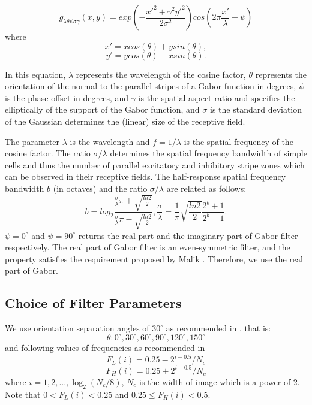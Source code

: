 \documentclass[article,oneside]{memoir}
\begin{document}
\begin{equation}
g_{\lambda\theta\psi\sigma\gamma}(x,y)=exp(-\frac{x'^2+\gamma^2y'^2}{2\sigma^2})cos(2\pi\frac{x'}{\lambda}+\psi)
\end{equation}
where 
$$x' = x cos(\theta) + y sin(\theta), $$
$$ y' = y cos(\theta) - x sin(\theta). $$  

In this equation,  $ \lambda $ represents the wavelength of the cosine factor,  $ \theta $ represents the orientation of the normal to the parallel stripes of a Gabor function in degrees,  $ \psi $ is the phase offset in degrees, and  $ \gamma $ is the spatial aspect ratio and specifies the elliptically of the support of the Gabor function, and $ \sigma $ is the standard deviation of the Gaussian determines the (linear) size of the receptive field. 

The parameter $ \lambda $ is the wavelength and $ f = 1 / \lambda$ is the spatial frequency of the cosine factor. 
The ratio $ \sigma / \lambda $ determines the spatial frequency bandwidth of simple cells and thus the number of parallel excitatory and inhibitory stripe zones which can be observed in their receptive fields. The half-response spatial frequency bandwidth $ b$  (in octaves) and the ratio $ \sigma / \lambda $ are related as follows: 
\begin{equation}
b = log_2 \frac{ \frac{ \sigma }{ \lambda } \pi + \sqrt{\frac{ln2}{2}}}{\frac{\sigma}{\lambda} \pi - \sqrt{\frac{ln2}{2}}},
\frac{\sigma}{\lambda} = \frac{1}{\pi} \sqrt{\frac{ln2}{2}}\frac{2^b + 1}{2^b - 1}. 
\label{eq:gaborsigma}
\end{equation}
$ \psi = 0^\circ $ and $ \psi = 90^\circ $ returns the real part and the imaginary part of Gabor filter respectively. 
The real part of Gabor filter is an even-symmetric filter, and the property satisfies the requirement proposed by Malik \cite{Malik}. 
Therefore, we use the real part of Gabor. 

\subsection{Choice of Filter Parameters}

We use orientation separation angles of $ 30^\circ $ as recommended in \cite{Clausi}, that is:
$$ \theta: 0^\circ, 30^\circ, 60^\circ, 90^\circ, 120^\circ, 150^\circ $$
and following values of frequencies as recommended in \cite{Zhang}
$$ F_L(i) = 0.25 - 2^{i - 0.5} / N_c  $$
$$ F_H(i) = 0.25 + 2^{i - 0.5} / N_c $$
where $ i = 1,2, ... , \log_2(N_c/8) $, 
$ N_c $ is the width of image which is a power of 2. 
Note that $ 0 < F_L(i) < 0.25 $ and $ 0.25 \le F_H(i) < 0.5 $. 
\end{document}
